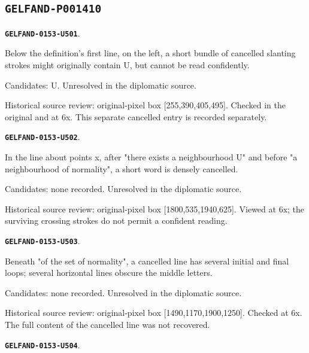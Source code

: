 \documentclass[11pt]{article}
\theoremstyle{definition}
\theoremstyle{remark}
\begin{document}
\subsection*{\texttt{GELFAND-P001410}}
\par\noindent\leavevmode{}\label{GELFAND-0153-U501}\label{GELFAND-P001410:isolated-cancellation:note}\textbf{\texttt{GELFAND-0153-U501}}.\nopagebreak[4]\par
Below the definition's first line, on the left, a short bundle of cancelled slanting strokes might originally contain U, but cannot be read confidently.\par
Candidates: U. Unresolved in the diplomatic source.\par
Historical source review: original-pixel box [255,390,405,495]. Checked in the original and at 6x. This separate cancelled entry is recorded separately.\par\medskip
\par\noindent\leavevmode{}\label{GELFAND-0153-U502}\label{GELFAND-P001410:normality-cancellation:note}\textbf{\texttt{GELFAND-0153-U502}}.\nopagebreak[4]\par
In the line about points x, after "there exists a neighbourhood U" and before "a neighbourhood of normality", a short word is densely cancelled.\par
Candidates: none recorded. Unresolved in the diplomatic source.\par
Historical source review: original-pixel box [1800,535,1940,625]. Viewed at 6x; the surviving crossing strokes do not permit a confident reading.\par\medskip
\par\noindent\leavevmode{}\label{GELFAND-0153-U503}\label{GELFAND-P001410:components-cancellation:note}\textbf{\texttt{GELFAND-0153-U503}}.\nopagebreak[4]\par
Beneath "of the set of normality", a cancelled line has several initial and final loops; several horizontal lines obscure the middle letters.\par
Candidates: none recorded. Unresolved in the diplomatic source.\par
Historical source review: original-pixel box [1490,1170,1900,1250]. Checked at 6x. The full content of the cancelled line was not recovered.\par\medskip
\par\noindent\leavevmode{}\label{GELFAND-0153-U504}\label{GELFAND-P001410:sullivan-cancellation:note}\textbf{\texttt{GELFAND-0153-U504}}.\nopagebreak[4]\par
\end{document}
